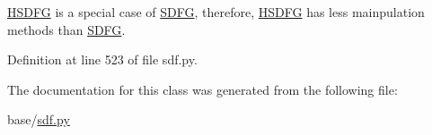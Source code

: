 \hyperlink{classsylva_1_1base_1_1sdf_1_1_h_s_d_f_g}{H\+S\+D\+FG} is a special case of \hyperlink{classsylva_1_1base_1_1sdf_1_1_s_d_f_g}{S\+D\+FG}, therefore, \hyperlink{classsylva_1_1base_1_1sdf_1_1_h_s_d_f_g}{H\+S\+D\+FG} has less mainpulation methods than \hyperlink{classsylva_1_1base_1_1sdf_1_1_s_d_f_g}{S\+D\+FG}. 

Definition at line 523 of file sdf.\+py.



The documentation for this class was generated from the following file\+:\begin{DoxyCompactItemize}
\item 
base/\hyperlink{sdf_8py}{sdf.\+py}\end{DoxyCompactItemize}

